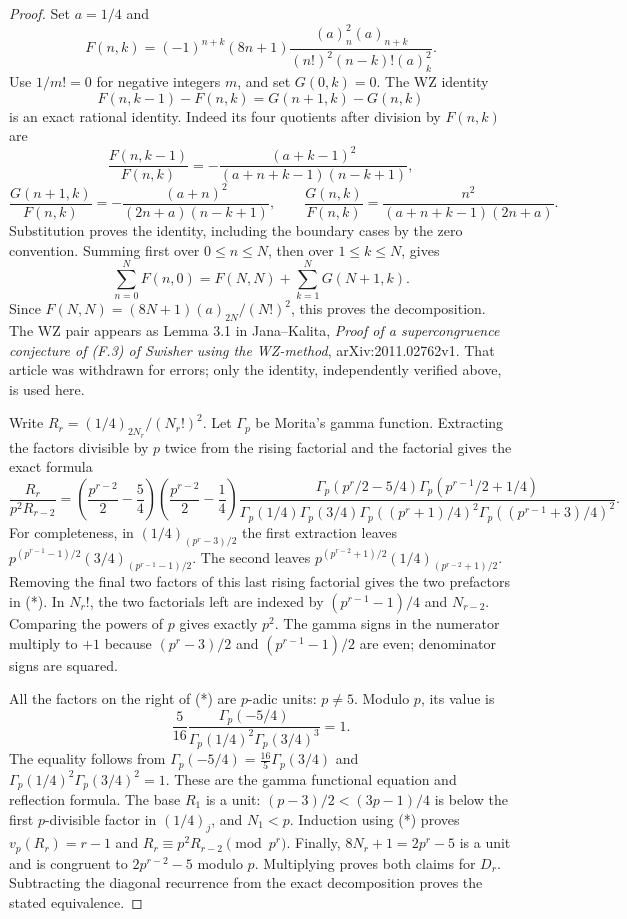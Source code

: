 \documentclass[11pt,letterpaper]{article}
\numberwithin{equation}{section}
\begin{document}
\begin{proof}
Set $a=1/4$ and
\[
 F(n,k)=(-1)^{n+k}(8n+1)
 \frac{(a)_n^2(a)_{n+k}}{(n!)^2(n-k)!(a)_k^2}.
\]
Use $1/m!=0$ for negative integers $m$, and set $G(0,k)=0$.
The WZ identity
\[
 F(n,k-1)-F(n,k)=G(n+1,k)-G(n,k)
\]
is an exact rational identity. Indeed its four quotients after division
by $F(n,k)$ are
\[
 \frac{F(n,k-1)}{F(n,k)}=-\frac{(a+k-1)^2}{(a+n+k-1)(n-k+1)},
\]
\[
 \frac{G(n+1,k)}{F(n,k)}=-\frac{(a+n)^2}{(2n+a)(n-k+1)},\qquad
 \frac{G(n,k)}{F(n,k)}=\frac{n^2}{(a+n+k-1)(2n+a)}.
\]
Substitution proves the identity, including the boundary cases by the
zero convention. Summing first over $0\le n\le N$, then over
$1\le k\le N$, gives
\[
 \sum_{n=0}^NF(n,0)=F(N,N)+\sum_{k=1}^NG(N+1,k).
\]
Since $F(N,N)=(8N+1)(a)_{2N}/(N!)^2$, this proves the decomposition.
The WZ pair appears as Lemma 3.1 in Jana--Kalita,
\emph{Proof of a supercongruence conjecture of (F.3) of Swisher using
the WZ-method}, arXiv:2011.02762v1. That article was withdrawn for
errors; only the identity, independently verified above, is used here.

Write $R_r=(1/4)_{2N_r}/(N_r!)^2$. Let $\Gamma_p$ be Morita's gamma
function. Extracting the factors divisible by $p$ twice from the rising
factorial and the factorial gives the exact formula
\[
 \frac{R_r}{p^2R_{r-2}}=
 \left(\frac{p^{r-2}}2-\frac54\right)
 \left(\frac{p^{r-2}}2-\frac14\right)
 \frac{\Gamma_p(p^r/2-5/4)\Gamma_p(p^{r-1}/2+1/4)}
 {\Gamma_p(1/4)\Gamma_p(3/4)
  \Gamma_p((p^r+1)/4)^2\Gamma_p((p^{r-1}+3)/4)^2}.
\tag{*}
\]
For completeness, in $(1/4)_{(p^r-3)/2}$ the first extraction leaves
$p^{(p^{r-1}-1)/2}(3/4)_{(p^{r-1}-1)/2}$. The second leaves
$p^{(p^{r-2}+1)/2}(1/4)_{(p^{r-2}+1)/2}$. Removing the final two
factors of this last rising factorial gives the two prefactors in (*).
In $N_r!$, the two factorials left are indexed by
$(p^{r-1}-1)/4$ and $N_{r-2}$. Comparing the powers of $p$ gives
exactly $p^2$. The gamma signs in the numerator multiply to $+1$
because $(p^r-3)/2$ and $(p^{r-1}-1)/2$ are even; denominator signs
are squared.

All the factors on the right of (*) are $p$-adic units: $p\ne5$.
Modulo $p$, its value is
\[
 \frac5{16}\frac{\Gamma_p(-5/4)}
 {\Gamma_p(1/4)^2\Gamma_p(3/4)^3}=1.
\]
The equality follows from
$\Gamma_p(-5/4)=\frac{16}5\Gamma_p(3/4)$ and
$\Gamma_p(1/4)^2\Gamma_p(3/4)^2=1$.
These are the gamma functional equation and reflection formula.
The base $R_1$ is a unit: $(p-3)/2<(3p-1)/4$ is below the first
$p$-divisible factor in $(1/4)_j$, and $N_1<p$.
Induction using (*) proves $v_p(R_r)=r-1$ and
$R_r\equiv p^2R_{r-2}\pmod{p^r}$. Finally,
$8N_r+1=2p^r-5$ is a unit and is congruent to
$2p^{r-2}-5$ modulo $p$. Multiplying proves both claims for $D_r$.
Subtracting the diagonal recurrence from the exact decomposition proves
the stated equivalence.
\end{proof}
\end{document}
